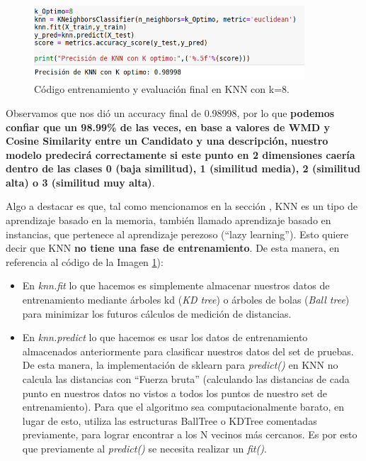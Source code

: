 \documentclass[12pt,a4paper]{article}
\begin{document}
\begin{sloppypar}
\begin{figure}[H]   
\centering
\includegraphics[width=0.9\textwidth]{images/implementacion_5/train_knn_con_k_8.png}
\caption{Código entrenamiento y evaluación final en KNN con k=8.}
\label{fig:train_knn_con_k_8}
\end{figure}

Observamos que nos dió un accuracy final de 0.98998, por lo que \textbf{podemos confiar que un 98.99\% de las veces, en base a valores de WMD y Cosine Similarity entre un Candidato y una descripción, nuestro modelo predecirá correctamente si este punto en 2 dimensiones caería dentro de las clases 0 (baja similitud), 1 (similitud media), 2 (similitud alta) o 3 (similitud muy alta)}. 

Algo a destacar es que, tal como mencionamos en la sección \textit{}, KNN es un tipo de aprendizaje basado en la memoria, también llamado aprendizaje basado en instancias, que pertenece al aprendizaje perezoso (“lazy learning”). Esto quiere decir que KNN \textbf{no tiene una fase de entrenamiento}. De esta manera, en referencia al código de la Imagen \ref{fig:train_knn_con_k_8}):

\begin{itemize}

\item En \textit{knn.fit} lo que hacemos es simplemente almacenar nuestros datos de entrenamiento mediante árboles kd (\textit{KD tree}) o árboles de bolas (\textit{Ball tree}) para minimizar los futuros cálculos de medición de distancias. 

\item En \textit{knn.predict} lo que hacemos es usar los datos de entrenamiento almacenados anteriormente para clasificar nuestros datos del set de pruebas. De esta manera, la implementación de sklearn para \textit{predict()} en KNN no calcula las distancias con “Fuerza bruta” (calculando las distancias de cada punto en nuestros datos no vistos a todos los puntos de nuestro set de entrenamiento). Para que el algoritmo sea computacionalmente barato, en lugar de esto, utiliza las estructuras BallTree o KDTree comentadas previamente, para lograr encontrar a los N vecinos más cercanos. Es por esto que previamente al \textit{predict()} se necesita realizar un \textit{fit()}.


\end{itemize}
\end{sloppypar}
\end{document}
